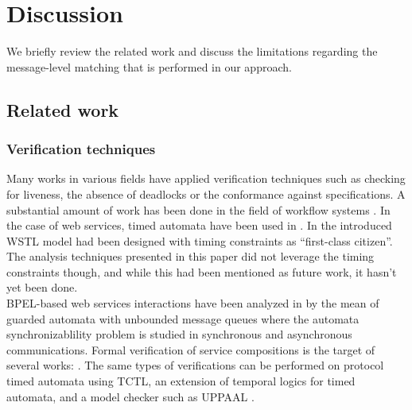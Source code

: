 
\section{Discussion}


We briefly review the related work and discuss the limitations regarding the message-level matching that is performed in our approach.


\subsection{Related work}


\subsubsection{Verification techniques}


Many works in various fields have applied verification techniques such as checking for liveness, the absence of deadlocks or the conformance against specifications.
%
A substantial amount of work has been done in the field of workflow systems \cite{aalst98application,DMMZ06,BWJ02}.
In the case of web services, timed automata have been used in \cite{KazhamiakinPP06,DCPVC06}. In  \cite{berardi03finite} the introduced WSTL model had been designed with timing constraints as ``first-class citizen''. The analysis techniques presented in this paper did not leverage the timing constraints though, and while this had been mentioned as future work, it hasn't yet been done.\\

BPEL-based web services interactions have been analyzed in \cite{FBS04} by the mean of guarded automata with unbounded message queues where the automata synchronizablility problem is studied in synchronous and asynchronous communications.
Formal verification of service compositions is the target of several works: \cite{RouachedPG06,Bultan03,GLTXH07,FUMK03}.
The same types of verifications can be performed on protocol timed automata using TCTL, an extension of temporal logics for timed automata, and a model checker such as UPPAAL \cite{UPPAAL}.

